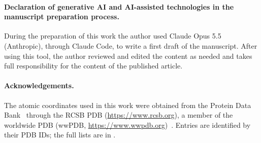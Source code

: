 \paragraph{Declaration of generative AI and AI-assisted technologies in the manuscript preparation process.}
During the preparation of this work the author used Claude Opus 5.5
(Anthropic), through Claude Code, to write a first draft of the manuscript.
After using this tool, the author reviewed and edited the content as needed
and takes full responsibility for the content of the published article.

\paragraph{Acknowledgements.}
The atomic coordinates used in this work were obtained from the 
Protein Data Bank~\cite{berman2000pdb} through the
RCSB PDB (\url{https://www.rcsb.org}), a member of the worldwide PDB
(wwPDB, \url{https://www.wwpdb.org})~\cite{berman2003wwpdb,wwpdb2019}.
Entries are identified by their PDB IDs; the full lists are in
.

